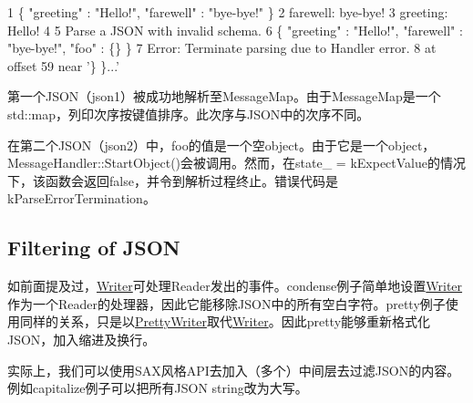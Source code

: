 \begin{DoxyCode}
1 \{ "greeting" : "Hello!", "farewell" : "bye-bye!" \}
2 farewell: bye-bye!
3 greeting: Hello!
4 
5 Parse a JSON with invalid schema.
6 \{ "greeting" : "Hello!", "farewell" : "bye-bye!", "foo" : \{\} \}
7 Error: Terminate parsing due to Handler error.
8  at offset 59 near '\} \}...'
\end{DoxyCode}


第一个\+J\+S\+O\+N（{\ttfamily json1}）被成功地解析至{\ttfamily Message\+Map}。由于{\ttfamily Message\+Map}是一个{\ttfamily std\+::map}，列印次序按键值排序。此次序与\+J\+S\+O\+N中的次序不同。

在第二个\+J\+S\+O\+N（{\ttfamily json2}）中，{\ttfamily foo}的值是一个空object。由于它是一个object，{\ttfamily Message\+Handler\+::\+Start\+Object()}会被调用。然而，在{\ttfamily state\+\_\+ = k\+Expect\+Value}的情况下，该函数会返回{\ttfamily false}，并令到解析过程终止。错误代码是{\ttfamily k\+Parse\+Error\+Termination}。\hypertarget{md_Cadriciel_Commun_Externe_RapidJSON_doc_sax.zh-cn_Filtering}{}\subsection{Filtering of J\+S\+ON}\label{md_Cadriciel_Commun_Externe_RapidJSON_doc_sax.zh-cn_Filtering}
如前面提及过，{\ttfamily \hyperlink{class_writer}{Writer}}可处理{\ttfamily Reader}发出的事件。{\ttfamily condense}例子简单地设置{\ttfamily \hyperlink{class_writer}{Writer}}作为一个{\ttfamily Reader}的处理器，因此它能移除\+J\+S\+O\+N中的所有空白字符。{\ttfamily pretty}例子使用同样的关系，只是以{\ttfamily \hyperlink{class_pretty_writer}{Pretty\+Writer}}取代{\ttfamily \hyperlink{class_writer}{Writer}}。因此{\ttfamily pretty}能够重新格式化\+J\+S\+O\+N，加入缩进及换行。

实际上，我们可以使用\+S\+A\+X风格\+A\+P\+I去加入（多个）中间层去过滤\+J\+S\+O\+N的内容。例如{\ttfamily capitalize}例子可以把所有\+J\+S\+ON string改为大写。


